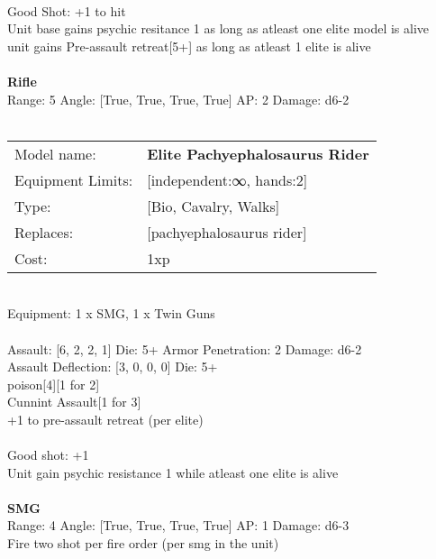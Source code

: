 \ \\
Good Shot: +1 to hit\\ 
Unit base gains psychic resitance 1 as long as atleast one elite model is alive\\ 
unit gains Pre-assault retreat[5+] as long as atleast 1 elite is alive\\ 

\ \\
{\bf Rifle } \\



Range: 5  Angle: [True, True, True, True] AP: 2 Damage: d6-2 \\




 
\ \\

\noindent
\begin{tabular}{ll}
Model name: &{\bf Elite Pachyephalosaurus Rider } \\
Equipment Limits: &[independent:∞, hands:2] \\
Type: &[Bio, Cavalry, Walks] \\
Replaces: &[pachyephalosaurus rider] \\
Cost: & 1xp\\
\end{tabular}
\ \\
Equipment: 1 x SMG, 1 x Twin Guns \\
\ \\
Assault: [6, 2, 2, 1] Die: 5+ Armor Penetration: 2 Damage: d6-2 \\
Assault Deflection: [3, 0, 0, 0] Die: 5+\\
\indent poison[4][1 for 2]\\ 
Cunnint Assault[1 for 3]\\ 
+1 to pre-assault retreat (per elite)\\ 
 
\ \\
Good shot: +1\\ 
Unit gain psychic resistance 1 while atleast one elite is alive\\ 

\ \\
{\bf SMG } \\



Range: 4  Angle: [True, True, True, True] AP: 1 Damage: d6-3 \\
Fire two shot per fire order (per smg in the unit)\\ 




